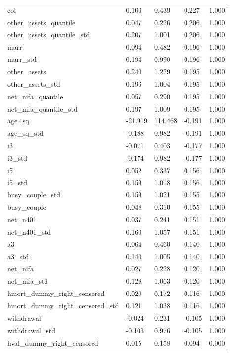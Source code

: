 \documentclass[12pt,a4paper]{article}
\begin{document}
\begin{singlespace}
\begin{ThreePartTable}
\begin{longtable}{l C{2cm} C{2cm} C{2cm} C{2cm} }
  col & 0.100 & 0.439 & 0.227 & 1.000 \\ 
  other\_assets\_quantile & 0.047 & 0.226 & 0.206 & 1.000 \\ 
  other\_assets\_quantile\_std & 0.207 & 1.001 & 0.206 & 1.000 \\ 
  marr & 0.094 & 0.482 & 0.196 & 1.000 \\ 
  marr\_std & 0.194 & 0.990 & 0.196 & 1.000 \\ 
  other\_assets & 0.240 & 1.229 & 0.195 & 1.000 \\ 
  other\_assets\_std & 0.196 & 1.004 & 0.195 & 1.000 \\ 
  net\_nifa\_quantile & 0.057 & 0.290 & 0.195 & 1.000 \\ 
  net\_nifa\_quantile\_std & 0.197 & 1.009 & 0.195 & 1.000 \\ 
  age\_sq & -21.919 & 114.468 & -0.191 & 1.000 \\ 
  age\_sq\_std & -0.188 & 0.982 & -0.191 & 1.000 \\ 
  i3 & -0.071 & 0.403 & -0.177 & 1.000 \\ 
  i3\_std & -0.174 & 0.982 & -0.177 & 1.000 \\ 
  i5 & 0.052 & 0.337 & 0.156 & 1.000 \\ 
  i5\_std & 0.159 & 1.018 & 0.156 & 1.000 \\ 
  busy\_couple\_std & 0.159 & 1.021 & 0.155 & 1.000 \\ 
  busy\_couple & 0.048 & 0.310 & 0.155 & 1.000 \\ 
  net\_n401 & 0.037 & 0.241 & 0.151 & 1.000 \\ 
  net\_n401\_std & 0.160 & 1.057 & 0.151 & 1.000 \\ 
  a3 & 0.064 & 0.460 & 0.140 & 1.000 \\ 
  a3\_std & 0.140 & 1.005 & 0.140 & 1.000 \\ 
  net\_nifa & 0.027 & 0.228 & 0.120 & 1.000 \\ 
  net\_nifa\_std & 0.128 & 1.063 & 0.120 & 1.000 \\ 
  hmort\_dummy\_right\_censored & 0.020 & 0.172 & 0.116 & 1.000 \\ 
  hmort\_dummy\_right\_censored\_std & 0.121 & 1.038 & 0.116 & 1.000 \\ 
  withdrawal & -0.024 & 0.231 & -0.105 & 1.000 \\ 
  withdrawal\_std & -0.103 & 0.976 & -0.105 & 1.000 \\ 
  hval\_dummy\_right\_censored & 0.015 & 0.158 & 0.094 & 0.000 \\ 

\end{longtable}
\end{ThreePartTable}
\end{singlespace}
\end{document}

